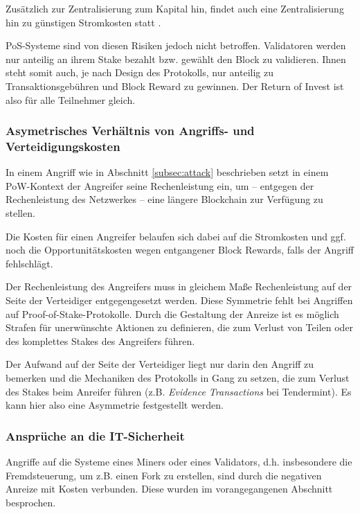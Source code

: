 Zusätzlich zur Zentralisierung zum Kapital hin, findet auch eine Zentralisierung hin zu günstigen Stromkosten statt \cite[S. 4]{nxt}.

PoS-Systeme sind von diesen Risiken jedoch nicht betroffen. Validatoren werden nur anteilig an ihrem Stake bezahlt bzw. gewählt den Block zu validieren. Ihnen steht somit auch, je nach Design des Protokolls, nur anteilig zu Transaktionsgebühren und Block Reward zu gewinnen. Der Return of Invest ist also für alle Teilnehmer gleich.

\subsubsection{Asymetrisches Verhältnis von Angriffs- und Verteidigungskosten}

In einem Angriff wie in Abschnitt \ref{subsec:attack} beschrieben setzt in einem PoW-Kontext der Angreifer seine Rechenleistung ein, um -- entgegen der Rechenleistung des Netzwerkes -- eine längere Blockchain zur Verfügung zu stellen.

Die Kosten für einen Angreifer belaufen sich dabei auf die Stromkosten und ggf. noch die Opportunitätskosten wegen entgangener Block Rewards, falls der Angriff fehlschlägt.

Der Rechenleistung des Angreifers muss in gleichem Maße Rechenleistung auf der Seite der Verteidiger entgegengesetzt werden. Diese Symmetrie fehlt bei Angriffen auf Proof-of-Stake-Protokolle. Durch die Gestaltung der Anreize ist es möglich Strafen für unerwünschte Aktionen zu definieren, die zum Verlust von Teilen oder des komplettes Stakes des Angreifers führen. 

Der Aufwand auf der Seite der Verteidiger liegt nur darin den Angriff zu bemerken und die Mechaniken des Protokolls in Gang zu setzen, die zum Verlust des Stakes beim Anreifer führen (z.B. \textit{Evidence Transactions} bei Tendermint).
Es kann hier also eine Asymmetrie festgestellt werden\footnotemark.


\subsubsection{Ansprüche an die IT-Sicherheit}

Angriffe auf die Systeme eines Miners oder eines Validators, d.h. insbesondere die Fremdsteuerung, um z.B. einen Fork zu erstellen, sind durch die negativen Anreize mit Kosten verbunden. 
Diese wurden im vorangegangenen Abschnitt besprochen. 

